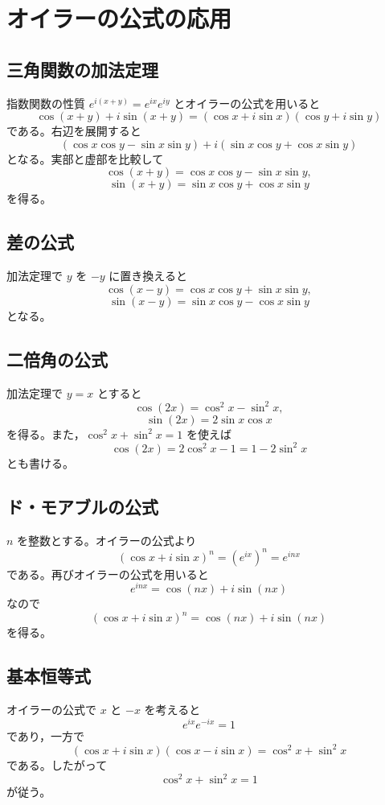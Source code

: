 \documentclass[a4paper,12pt]{jsarticle}
\theoremstyle{definition}
\begin{document}
\section{オイラーの公式の応用}

\subsection*{三角関数の加法定理}

指数関数の性質 $e^{i(x+y)}=e^{ix}e^{iy}$ とオイラーの公式を用いると
\[
\cos(x+y)+i\sin(x+y)
=(\cos x+i\sin x)(\cos y+i\sin y)
\]
である。右辺を展開すると
\[
(\cos x\cos y-\sin x\sin y)
+i(\sin x\cos y+\cos x\sin y)
\]
となる。実部と虚部を比較して
\[
\cos(x+y)=\cos x\cos y-\sin x\sin y,
\]
\[
\sin(x+y)=\sin x\cos y+\cos x\sin y
\]
を得る。

\subsection*{差の公式}

加法定理で $y$ を $-y$ に置き換えると
\[
\cos(x-y)=\cos x\cos y+\sin x\sin y,
\]
\[
\sin(x-y)=\sin x\cos y-\cos x\sin y
\]
となる。

\subsection*{二倍角の公式}

加法定理で $y=x$ とすると
\[
\cos(2x)=\cos^2 x-\sin^2 x,
\]
\[
\sin(2x)=2\sin x\cos x
\]
を得る。また，$\cos^2 x+\sin^2 x=1$ を使えば
\[
\cos(2x)=2\cos^2 x-1=1-2\sin^2 x
\]
とも書ける。

\subsection*{ド・モアブルの公式}

$n$ を整数とする。オイラーの公式より
\[
(\cos x+i\sin x)^n=(e^{ix})^n=e^{inx}
\]
である。再びオイラーの公式を用いると
\[
e^{inx}=\cos(nx)+i\sin(nx)
\]
なので
\[
(\cos x+i\sin x)^n=\cos(nx)+i\sin(nx)
\]
を得る。

\subsection*{基本恒等式}

オイラーの公式で $x$ と $-x$ を考えると
\[
e^{ix}e^{-ix}=1
\]
であり，一方で
\[
(\cos x+i\sin x)(\cos x-i\sin x)=\cos^2 x+\sin^2 x
\]
である。したがって
\[
\cos^2 x+\sin^2 x=1
\]
が従う。
\end{document}

